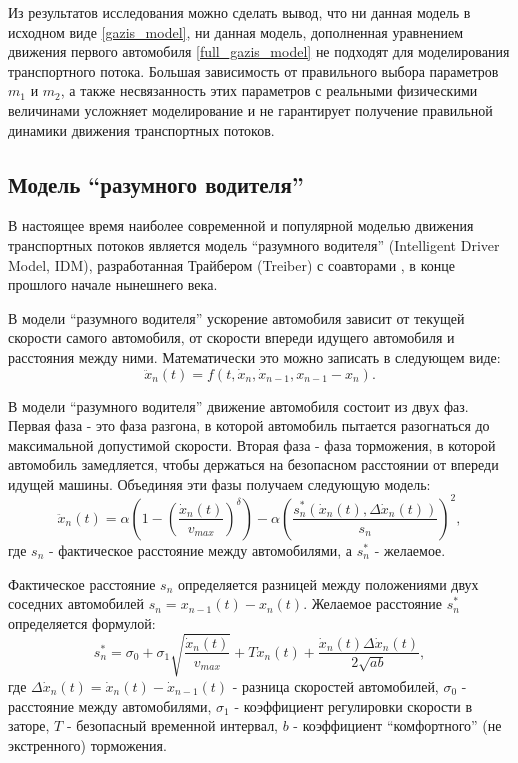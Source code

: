 \documentclass[12pt, a4paper]{extarticle}
\numberwithin{equation}{section}
\numberwithin{figure}{section}
\begin{document}
Из результатов исследования можно сделать вывод, что ни данная модель в исходном виде \eqref{gazis_model}, ни данная модель, дополненная уравнением движения первого автомобиля \eqref{full_gazis_model} не подходят для моделирования транспортного потока. Большая зависимость от правильного выбора параметров $m_1$ и $m_2$, а также несвязанность этих параметров с реальными физическими величинами усложняет моделирование и не гарантирует получение правильной динамики движения транспортных потоков. 

\subsection{Модель ``разумного водителя''}
В настоящее время наиболее современной и популярной моделью движения транспортных потоков является модель ``разумного водителя'' (Intelligent Driver Model, IDM), разработанная Трайбером (Treiber) с соавторами \cite{TreiberModel_1}, \cite{TreiberModel_2} в конце прошлого начале нынешнего века. 

В модели ``разумного водителя'' ускорение автомобиля зависит от текущей скорости самого автомобиля, от скорости впереди идущего автомобиля и расстояния между ними. Математически это можно записать в следующем виде:
\begin{equation*}
\ddot{x}_n(t)=f(t, \dot{x}_n,\dot{x}_{n-1}, x_{n-1}-x_n).
\end{equation*} 

В модели ``разумного водителя'' движение автомобиля состоит из двух фаз. Первая фаза - это фаза разгона, в которой автомобиль пытается разогнаться до максимальной допустимой скорости. Вторая фаза - фаза торможения, в которой автомобиль замедляется, чтобы держаться на безопасном расстоянии от впереди идущей машины. Объединяя эти фазы получаем следующую модель:
\begin{equation} \label{treiber_model}
\ddot{x}_n(t)= \alpha\left( 1-\left( \dfrac{\dot{x}_n(t)}{v_{max}}\right)^\delta \right) - \alpha\left( \dfrac{s^*_n(\dot{x}_n(t),\Delta \dot{x}_n(t))}{s_n}\right)^2,
\end{equation}
где $s_n$ - фактическое расстояние между автомобилями, а $s^*_n$ - желаемое.

Фактическое расстояние $s_n$ определяется разницей между положениями двух соседних автомобилей $s_n=x_{n-1}(t)-x_n(t)$. Желаемое расстояние  $s^*_n$ определяется формулой:
\begin{equation*}
s^*_n = \sigma_0+\sigma_1\sqrt{\dfrac{ \dot{x}_n(t)}{v_{max}}} +T \dot{x}_n(t)+ \dfrac{ \dot{x}_n(t)\Delta \dot{x}_n(t) }{2\sqrt{ab}},
\end{equation*}
где $\Delta \dot{x}_n(t) = \dot{x}_n(t)- \dot{x}_{n-1}(t)$ - разница скоростей автомобилей, $\sigma_0$ - расстояние между автомобилями, $\sigma_1$ - коэффициент регулировки скорости в заторе, $T$ - безопасный временной интервал, $b$ - коэффициент ``комфортного'' (не экстренного) торможения.
\end{document}
